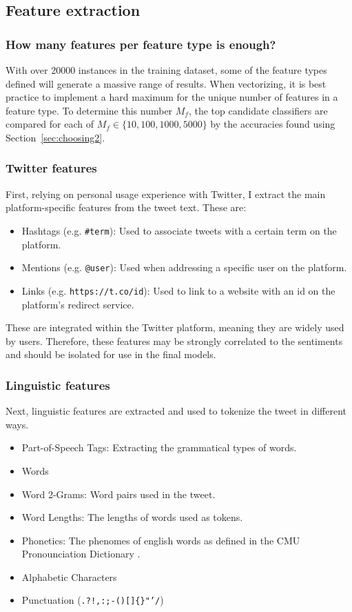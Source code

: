 \documentclass[11pt]{article}
\begin{document}
\subsection{Feature extraction}

\subsubsection{How many features per feature type is enough?}

With over 20000 instances in the training dataset, some of the feature types defined will generate a massive range of results.
When vectorizing, it is best practice to implement a hard maximum for the unique number of features in a feature type.
To determine this number $M_f$, the top candidate classifiers are compared for each of $M_f \in \lbrace 10, 100, 1000, 5000 \rbrace$ by the accuracies found using Section~\ref{sec:choosing2}.

\subsubsection{{T}witter features}

First, relying on personal usage experience with {T}witter, I extract the main platform-specific features from the tweet text.
These are:
\begin{itemize}
	\item Hashtags (e.g. \texttt{\#term}): Used to associate tweets with a certain term on the platform.
	\item Mentions (e.g. \texttt{@user}): Used when addressing a specific user on the platform.
	\item Links (e.g. \texttt{https://t.co/id}): Used to link to a website with an id on the platform's redirect service.
\end{itemize}  

These are integrated within the {T}witter platform, meaning they are widely used by users.
Therefore, these features may be strongly correlated to the sentiments and should be isolated for use in the final models.

\subsubsection{Linguistic features}

Next, linguistic features are extracted and used to tokenize the tweet in different ways. 

\begin{itemize}
	\item Part-of-Speech Tags: Extracting the grammatical types of words.
	\item Words
	\item Word 2-Grams: Word pairs used in the tweet.
	\item Word Lengths: The lengths of words used as tokens.
	\item Phonetics: The phenomes of english words as defined in the CMU Pronounciation Dictionary \cite{cmudict}.
	\item Alphabetic Characters
	\item Punctuation (\texttt{.?!,:;-()[]\{\}"'/})
\end{itemize}  
\end{document}
